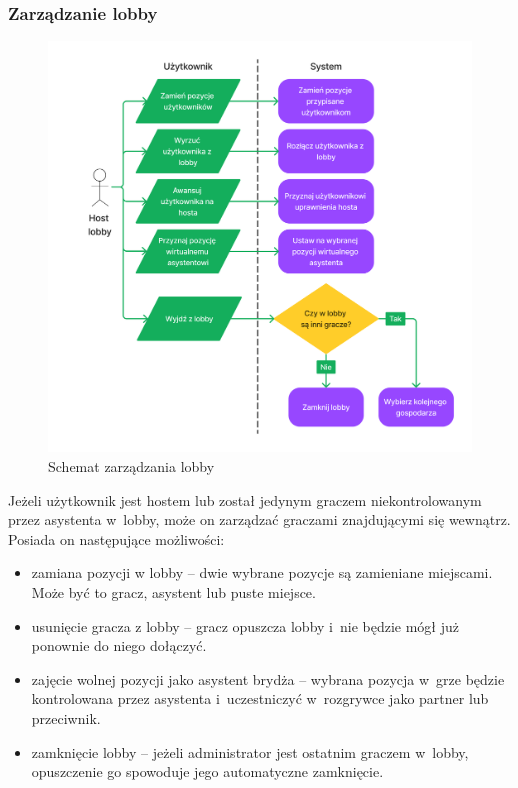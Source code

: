\FloatBarrier

\subsubsection{Zarządzanie lobby}

\begin{figure}[b!]
  \centering
  \includegraphics[width=\textwidth]{img/schematy/manage_lobby.png}
  \caption{Schemat zarządzania lobby}
\end{figure}

Jeżeli użytkownik jest hostem lub został jedynym
graczem niekontrolowanym przez asystenta w~lobby, może on zarządzać graczami
znajdującymi się
wewnątrz. Posiada on następujące możliwości:
\begin{itemize}
  \item zamiana pozycji w lobby -- dwie wybrane pozycje są zamieniane miejscami.
        Może być to gracz, asystent lub puste miejsce.
  \item usunięcie gracza z lobby -- gracz opuszcza lobby i~nie będzie
        mógł już ponownie do niego dołączyć.
  \item zajęcie wolnej pozycji jako asystent brydża -- wybrana pozycja
        w~grze będzie kontrolowana przez asystenta
        i~uczestniczyć w~rozgrywce jako partner lub przeciwnik.
  \item zamknięcie lobby -- jeżeli administrator jest ostatnim
        graczem w~lobby, opuszczenie go spowoduje jego automatyczne
        zamknięcie.

\end{itemize}

